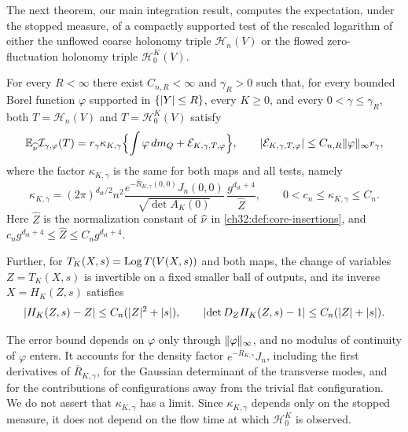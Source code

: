 The next theorem, our main integration result, computes the expectation, under the stopped measure, of a compactly supported test of the rescaled logarithm of either the unflowed coarse holonomy triple $\mathcal H_n(V)$ or the flowed zero-fluctuation holonomy triple $\mathcal H^K_0(V)$.

\begin{theorem}\label{ch32:thm:common-scalar-core}
For every $R<\infty$ there exist $C_{n,R}<\infty$ and $\gamma_R>0$ such that, for every bounded Borel function $\varphi$ supported in $\{\lvert Y\rvert\le R\}$, every $K\ge0$, and every $0<\gamma\le\gamma_R$, both $T=\mathcal H_n(V)$ and $T=\mathcal H^K_0(V)$ satisfy
\[
 \mathbb E_{\widehat\nu}\mathcal I_{\gamma,\varphi}(T)=r_\gamma\kappa_{K,\gamma}\Bigl\{\int\varphi\,dm_Q+\mathcal E_{K,\gamma,T,\varphi}\Bigr\},\qquad
 \lvert \mathcal E_{K,\gamma,T,\varphi}\rvert\le C_{n,R}\lVert \varphi\rVert_\infty r_\gamma,
\]
where the factor $\kappa_{K,\gamma}$ is the same for both maps and all tests, namely
\[
 \kappa_{K,\gamma}=(2\pi)^{d_{\mathrm{st}}/2}n^2\frac{e^{-\overline R_{K,\gamma}(0,0)}J_n(0,0)}{\sqrt{\det A_K(0)}}\,\frac{g^{d_{\mathrm{st}}+4}}{\widehat Z},\qquad0<c_n\le\kappa_{K,\gamma}\le C_n.
\]
Here $\widehat Z$ is the normalization constant of $\widehat\nu$ in \cref{ch32:def:core-insertions}, and $c_ng^{d_{\mathrm{st}}+4}\le\widehat Z\le C_ng^{d_{\mathrm{st}}+4}$.

Further, for $T_K(X,s)=\operatorname{Log} T(V(X,s))$ and both maps, the change of variables $Z=T_K(X,s)$ is invertible on a fixed smaller ball of outputs, and its inverse $X=H_K(Z,s)$ satisfies
\[
 \lvert H_K(Z,s)-Z\rvert\le C_n(\lvert Z\rvert^2+\lvert s\rvert),\qquad\lvert \det D_ZH_K(Z,s)-1\rvert\le C_n(\lvert Z\rvert+\lvert s\rvert).
\]
\end{theorem}

The error bound depends on $\varphi$ only through $\lVert \varphi\rVert_\infty$, and no modulus of continuity of $\varphi$ enters. It accounts for the density factor $e^{-\overline R_{K,\gamma}}J_n$, including the first derivatives of $\overline R_{K,\gamma}$, for the Gaussian determinant of the transverse modes, and for the contributions of configurations away from the trivial flat configuration. We do not assert that $\kappa_{K,\gamma}$ has a limit. Since $\kappa_{K,\gamma}$ depends only on the stopped measure, it does not depend on the flow time at which $\mathcal H^K_0$ is observed.

